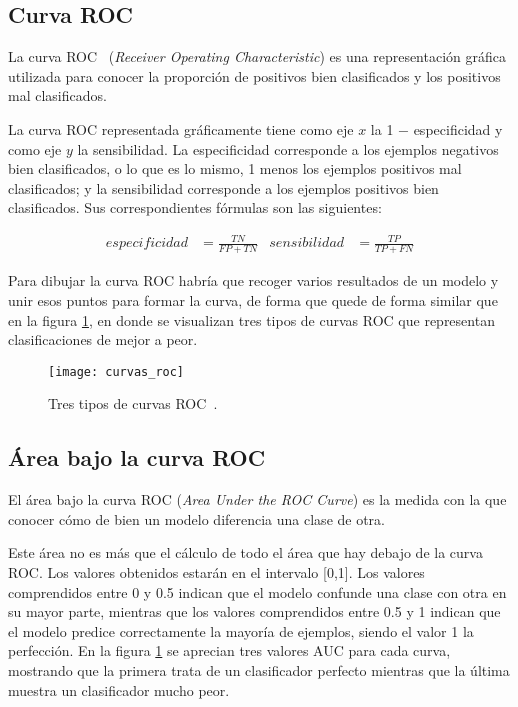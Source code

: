 \subsection{Curva ROC}
La curva ROC~\cite{wiki:roc} (\textit{Receiver Operating Characteristic}) es una representación gráfica utilizada para conocer la proporción de positivos bien clasificados y los positivos mal clasificados.

La curva ROC representada gráficamente tiene como eje $x$ la 1 $-$ especificidad y como eje $y$ la sensibilidad. La especificidad corresponde a los ejemplos negativos bien clasificados, o lo que es lo mismo, 1 menos los ejemplos positivos mal clasificados; y la sensibilidad corresponde a los ejemplos positivos bien clasificados. Sus correspondientes fórmulas son las siguientes:

\begin{align}
	especificidad &= \frac{TN}{FP+TN} &
	sensibilidad &= \frac{TP}{TP+FN}
\end{align}

Para dibujar la curva ROC habría que recoger varios resultados de un modelo y unir esos puntos para formar la curva, de forma que quede de forma similar que en la figura \ref{fig:roc}, en donde se visualizan tres tipos de curvas ROC que representan clasificaciones de mejor a peor.

\begin{figure}[h]
	\texttt{[image: curvas\_roc]}
	\caption[Tres tipos de curvas ROC.]{Tres tipos de curvas ROC~\cite{wiki:roc}.}
	\label{fig:roc}
\end{figure}

\subsection{Área bajo la curva ROC}
El área bajo la curva ROC (\textit{Area Under the ROC Curve}) es la medida con la que conocer cómo de bien un modelo diferencia una clase de otra.

Este área no es más que el cálculo de todo el área que hay debajo de la curva ROC. Los valores obtenidos estarán en el intervalo [0,1]. Los valores comprendidos entre 0 y 0.5 indican que el modelo confunde una clase con otra en su mayor parte, mientras que los valores comprendidos entre 0.5 y 1 indican que el modelo predice correctamente la mayoría de ejemplos, siendo el valor 1 la perfección. En la figura \ref{fig:roc} se aprecian tres valores AUC para cada curva, mostrando que la primera trata de un clasificador perfecto mientras que la última muestra un clasificador mucho peor.
